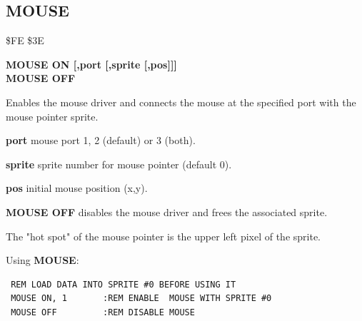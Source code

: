 \subsection{MOUSE}
\begin{description}[leftmargin=2cm,style=nextline]
\item [Token:] \$FE \$3E
\item [Format:] {\bf MOUSE ON [,port [,sprite [,pos]]]} \\
                {\bf MOUSE OFF}
\item [Usage:]  Enables the mouse driver
                and connects the mouse at the specified port
                with the mouse pointer sprite.

                {\bf port} mouse port 1, 2 (default) or 3 (both).

                {\bf sprite} sprite number for mouse pointer (default 0).

                {\bf pos} initial mouse position (x,y).

                {\bf MOUSE OFF} disables the mouse
                driver and frees the associated sprite.

\item [Remarks:] The "hot spot" of the mouse pointer is the upper left
                pixel of the sprite.

\item [Examples:] Using {\bf MOUSE}:
\begin{tcolorbox}[colback=black,coltext=white]
\verbatimfont{\codefont}
\begin{verbatim}
 REM LOAD DATA INTO SPRITE #0 BEFORE USING IT
 MOUSE ON, 1       :REM ENABLE  MOUSE WITH SPRITE #0
 MOUSE OFF         :REM DISABLE MOUSE
\end{verbatim}
\end{tcolorbox}
\end{description}


\newpage
